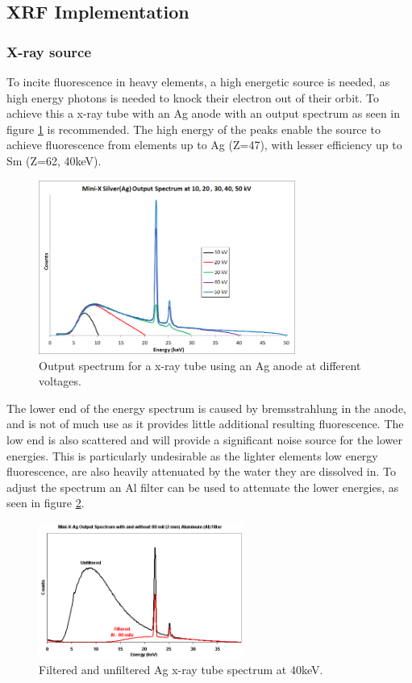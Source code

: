 \subsection{XRF Implementation}

\subsubsection{X-ray source}
To incite fluorescence in heavy elements, a high energetic source is needed, as high energy photons is needed to knock their electron out of their orbit. To achieve this a x-ray tube with an Ag anode with an output spectrum as seen in figure \ref{fig:AgSpectra} is recommended. The high energy of the peaks enable the source to achieve fluorescence from elements up to Ag (Z=47), with lesser efficiency up to Sm (Z=62, 40keV).

\begin{figure}[h]
	\centering
	\includegraphics[width=0.75\textwidth]{figures/XRF/minix50_ag6.png}
	\caption{Output spectrum for a x-ray tube using an Ag anode at different voltages.\citep{AmptekSource}}
	\label{fig:AgSpectra}
\end{figure}

The lower end of the energy spectrum is caused by bremsstrahlung in the anode, and is not of much use as it provides little additional resulting fluorescence. The low end is also scattered and will provide a significant noise source for the lower energies. This is particularly undesirable as the lighter elements low energy fluorescence, are also heavily attenuated by the water they are dissolved in. To adjust the spectrum an Al filter can be used to attenuate the lower energies, as seen in figure \ref{fig:AgSpectraFilt}.

\begin{figure}[htb]
	\centering
	\includegraphics[width=0.6\textwidth]{figures/XRF/minix_Fil.png}
	\caption{Filtered and unfiltered Ag x-ray tube spectrum at 40keV. \citep{AmptekSource}}
	\label{fig:AgSpectraFilt}
\end{figure}


